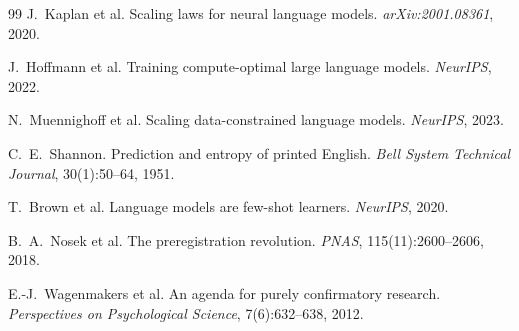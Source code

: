 \documentclass[11pt,a4paper]{article}
\begin{document}
\begin{thebibliography}{99}
J.~Kaplan et al.
\newblock Scaling laws for neural language models.
\newblock \emph{arXiv:2001.08361}, 2020.

J.~Hoffmann et al.
\newblock Training compute-optimal large language models.
\newblock \emph{NeurIPS}, 2022.

N.~Muennighoff et al.
\newblock Scaling data-constrained language models.
\newblock \emph{NeurIPS}, 2023.

C.~E.~Shannon.
\newblock Prediction and entropy of printed English.
\newblock \emph{Bell System Technical Journal}, 30(1):50--64, 1951.

T.~Brown et al.
\newblock Language models are few-shot learners.
\newblock \emph{NeurIPS}, 2020.

B.~A.~Nosek et al.
\newblock The preregistration revolution.
\newblock \emph{PNAS}, 115(11):2600--2606, 2018.

E.-J.~Wagenmakers et al.
\newblock An agenda for purely confirmatory research.
\newblock \emph{Perspectives on Psychological Science}, 7(6):632--638, 2012.

\end{thebibliography}
\end{document}

